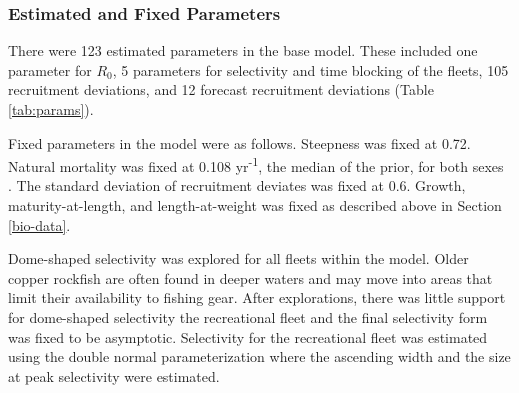 \documentclass[11pt,
  english,
  a4paper,
]{article}
\begin{document}
\leavevmode\tagmcend\tagstructend\par


\hypertarget{estimated-and-fixed-parameters}{%
\subsubsection{Estimated and Fixed Parameters}\label{estimated-and-fixed-parameters}}

\leavevmode\tagmcend\tagstructend


There were 123 estimated parameters in the base model. These included one parameter for {\(R_0\)\leavevmode\tagmcend\tagstructend}, 5 parameters for selectivity and time blocking of the fleets, 105 recruitment deviations, and 12 forecast recruitment deviations (Table \ref{tab:params}).

\leavevmode\tagmcend\tagstructend\par


Fixed parameters in the model were as follows. Steepness was fixed at 0.72. Natural mortality was fixed at 0.108 yr\textsuperscript{-1}, the median of the prior, for both sexes . The standard deviation of recruitment deviates was fixed at 0.6. Growth, maturity-at-length, and length-at-weight was fixed as described above in Section \ref{bio-data}.

\leavevmode\tagmcend\tagstructend\par


Dome-shaped selectivity was explored for all fleets within the model. Older copper rockfish are often found in deeper waters and may move into areas that limit their availability to fishing gear. After explorations, there was little support for dome-shaped selectivity the recreational fleet and the final selectivity form was fixed to be asymptotic. Selectivity for the recreational fleet was estimated using the double normal parameterization where the ascending width and the size at peak selectivity were estimated.

\leavevmode\tagmcend\tagstructend\par

\end{document}
